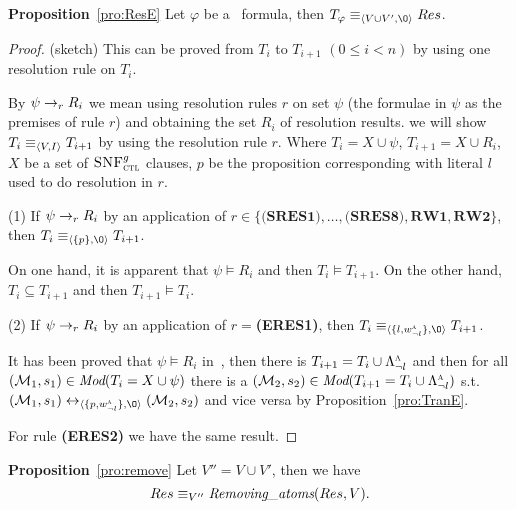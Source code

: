 \documentclass[letterpaper]{article}
\begin{document}
\noindent\textbf{Proposition}~\ref{pro:ResE}
 Let $\varphi$ be a \CTL\ formula,
 then $T_{\varphi} \equiv_{\tuple{V \cup V', {\O}}} Res$.

\begin{proof}(sketch)
This can be proved from $T_i$ to $T_{i+1}$ $(0\leq i < n)$ by using one resolution rule on $T_i$.


By $\psi \rightarrow_r R_i$ we mean using resolution rules $r$ on set $\psi$ (the formulae in $\psi$ as the premises of rule $r$) and obtaining the set $R_i$ of resolution results.
we will show $T_i \equiv_{{\langle{V,I}\rangle}} T_{i+1}$ by using the resolution rule $r$. Where $T_i= X \cup \psi$, $T_{i+1}=X \cup R_i$, $X$ be a set of ${\textsc{SNF}_{\textsc{ctl}}^g}$ clauses, $p$ be the proposition corresponding with literal $l$ used to do resolution in $r$.

(1) If $\psi \rightarrow_r R_i$ by an application of $r\in \{\textbf{(SRES1)}, \dots, \textbf{(SRES8)}, \textbf{RW1}, \textbf{RW2}\}$, then $T_i \equiv_{\tuple{\{p\}, {\O}}} T_{i+1}$.


On one hand, it is apparent that $\psi \models R_i$ and then $T_i \models T_{i+1}$. On the other hand, $T_i\subseteq T_{i+1}$ and then $T_{i+1} \models T_i$.

(2) If $\psi \rightarrow_r R_i$ by an application of $r=$\textbf{(ERES1)},
then $T_i \equiv_{\tuple{\{l, w_{\neg l}^{\ALL}\}, {\O}}} T_{i+1}$.

It has been proved that $\psi \models R_i$ in~\cite{bolotov2000clausal}, then there is $T_{i+1}=T_i \cup \Lambda_{\neg l}^{\textsc{a}}$ and  then for all $({\cal M}_1,s_1) \in \textit{Mod}(T_i= X \cup \psi)$ there is a $({\cal M}_2, s_2)\in \textit{Mod}(T_{i+1}=T_i \cup \Lambda_{\neg l}^{\textsc{a}})$ s.t. $(\Hm_1, s_1) \lrto_{\tuple{\{p, w_{\neg l}^{\ALL}\}, {\O}}} (\Hm_2, s_2)$ and vice versa by Proposition~\ref{pro:TranE}.

For rule \textbf{(ERES2)} we have the same result.

\end{proof}


\noindent\textbf{Proposition}~\ref{pro:remove}
Let $V''=V \cup V'$, then we have
 \[
   Res \equiv_{V''}  \emph{Removing\_atoms}(Res, V).
 \]
\end{document}

